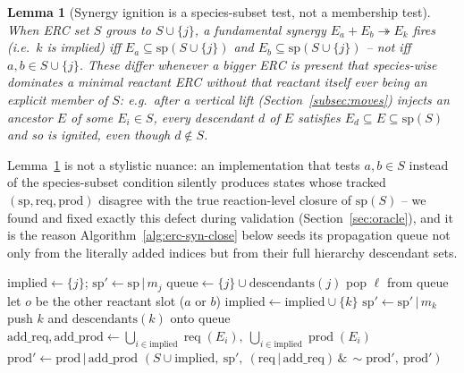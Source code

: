 \documentclass[11pt]{article}
\theoremstyle{plain}
\newtheorem{lemma}{Lemma}
\theoremstyle{remark}
\newcommand{\prods}{\operatorname{prod}}
\newcommand{\req}{\operatorname{req}}
\begin{document}
\begin{lemma}[Synergy ignition is a species-subset test, not a membership
test]
\label{lem:synignite}
When ERC set $S$ grows to $S\cup\{j\}$, a fundamental synergy
$E_a+E_b\twoheadrightarrow E_k$ fires (i.e.\ $k$ is implied) iff
$E_a\subseteq\mathrm{sp}(S\cup\{j\})$ and $E_b\subseteq\mathrm{sp}(S\cup\{j\})$
-- \emph{not} iff $a,b\in S\cup\{j\}$. These differ whenever a bigger ERC
is present that species-wise dominates a minimal reactant ERC without that
reactant itself ever being an explicit member of $S$: e.g.\ after a
vertical lift (Section~\ref{subsec:moves}) injects an ancestor $E$ of some
$E_i\in S$, every descendant $d$ of $E$ satisfies
$E_d\subseteq E\subseteq\mathrm{sp}(S)$ and so is ignited, even though
$d\notin S$.
\end{lemma}

Lemma~\ref{lem:synignite} is not a stylistic nuance: an implementation
that tests $a,b\in S$ instead of the species-subset condition silently
produces states whose tracked $(\mathrm{sp},\mathrm{req},\mathrm{prod})$
disagree with the true reaction-level closure of $\mathrm{sp}(S)$ -- we
found and fixed exactly this defect during validation
(Section~\ref{sec:oracle}), and it is the reason
Algorithm~\ref{alg:erc-syn-close} below seeds its propagation queue not
only from the literally added indices but from their full hierarchy
descendant sets.

\begin{algorithm}[t]
\caption{ExtendState($S$, $\mathrm{sp}$, $\mathrm{req}$, $\mathrm{prod}$, $j$)}
\label{alg:erc-syn-close}
\begin{algorithmic}[1]
\State $\text{implied} \leftarrow \{j\}$; $\text{sp}' \leftarrow \mathrm{sp}\,|\,m_j$
\State $\text{queue} \leftarrow \{j\}\cup\mathrm{descendants}(j)$
  \State pop $\ell$ from queue
    \State let $o$ be the other reactant slot ($a$ or $b$)
     
      \State $\text{implied}\leftarrow\text{implied}\cup\{k\}$
      \State $\text{sp}'\leftarrow\text{sp}'\,|\,m_k$
      \State push $k$ and $\mathrm{descendants}(k)$ onto queue
    \EndIf
  \EndFor
\EndWhile
\State $\text{add\_req},\text{add\_prod}\leftarrow \bigcup_{i\in\text{implied}}\req(E_i),\ \bigcup_{i\in\text{implied}}\prods(E_i)$
\State $\text{prod}'\leftarrow\mathrm{prod}\,|\,\text{add\_prod}$
\State \Return $(S\cup\text{implied},\ \text{sp}',\ (\mathrm{req}\,|\,\text{add\_req})\,\&\,\sim\text{prod}',\ \text{prod}')$
\end{algorithmic}
\end{algorithm}
\end{document}
